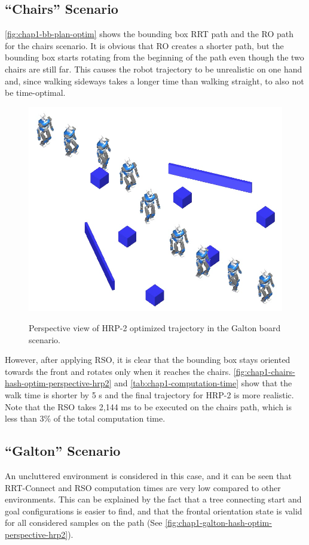 \subsection{``Chairs'' Scenario}
\autoref{fig:chap1-bb-plan-optim} shows the bounding box RRT path
and the RO path for the chairs scenario. It is obvious that RO creates
a shorter path, but the bounding box starts rotating from the
beginning of the path even though the two chairs are still far. This
causes the robot trajectory to be unrealistic on one hand and, since
walking sideways takes a longer time than walking straight, to also
not be time-optimal.

\begin{figure}
  \centering
      {\includegraphics[width = \linewidth]
        {src/chap1-path-optimization/galton-hash-optim-perspective-hrp2.png}}
      \caption{Perspective view of HRP-2 optimized trajectory in the
        Galton board scenario.}
      \label{fig:chap1-galton-hash-optim-perspective-hrp2}
\end{figure}

However, after applying RSO, it is clear that the bounding box stays
oriented towards the front and rotates only when it reaches the
chairs. \autoref{fig:chap1-chairs-hash-optim-perspective-hrp2} and
\autoref{tab:chap1-computation-time} show that the walk time is shorter by 5
s and the final trajectory for HRP-2 is more realistic. Note that the
RSO takes 2,144 ms to be executed on the chairs path, which is less
than 3\% of the total computation time.

\subsection{``Galton'' Scenario}
An uncluttered environment is considered in this case, and
it can be seen that RRT-Connect and RSO computation times are very low
compared to other environments. This can be explained by the fact that
a tree connecting start and goal configurations is easier to find, and
that the frontal orientation state is valid for all considered samples
on the path (See \autoref{fig:chap1-galton-hash-optim-perspective-hrp2}).

